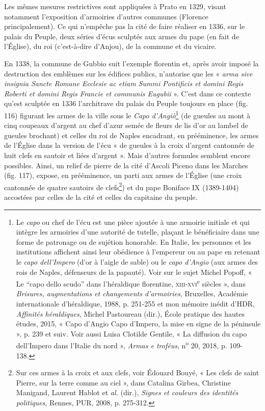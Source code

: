 \documentclass[12pt,twoside,openany]{book}
\begin{document}
Les mêmes mesures restrictives sont appliquées à Prato en 1329, visant notamment l’exposition d’armoiries d’autres communes (Florence principalement). Ce qui n’empêche pas la cité de faire réaliser en 1336, sur le palais du Peuple, deux séries d’écus sculptés aux armes du pape (en fait de l’Église), du roi (c’est-à-dire d’Anjou), de la commune et du vicaire.

En 1338, la commune de Gubbio suit l’exemple florentin et, après avoir imposé la destruction des emblèmes sur les édifices publics, n’autorise que les « \textit{arma sive insignia Sancte Romane Ecclesie ac etiam Summi Pontificis et domini Regis Roberti et domini Regis Francie et communis Eugubii }». C’est dans ce contexte qu’est sculptée en 1336 l’architrave du palais du Peuple toujours en place (fig. 116) figurant les armes de la ville sous le \textit{Capo d’Angiò}\footnote{Le \textit{capo} ou chef de l’écu est une pièce ajoutée à une armoirie initiale et qui intègre les armoiries d’une autorité de tutelle, plaçant le bénéficiaire dans une forme de patronage ou de sujétion honorable. En Italie, les personnes et les institutions affichent ainsi leur obédience à l’empereur ou au pape en retenant le \textit{capo dell’Impero} (d’or à l’aigle de sable) ou le \textit{capo d’Angio} (aux armes des rois de Naples, défenseurs de la papauté). Voir sur le sujet Michel Popoff, « Le “capo dello scudo” dans l’héraldique florentine, \textsc{xiii-xvi}\textsuperscript{e} siècles », dans \textit{Brisures, augmentations et changements d'armoiries}, Bruxelles, Académie internationale d’héraldique, 1988, p. 251-255 et mon mémoire inédit d’HDR, \textit{Affinités héraldiques}, Michel Pastoureau (dir.), École pratique des hautes études, 2015, « Capo d’Angio Capo d’Impero, la mise en signe de la péninsule », p. 239 et suiv. Voir aussi Luisa Clotilde Gentile, « La diffusion du capo dell'Impero dans l’Italie du nord », \textit{Armas e troféus}, n\textsuperscript{o} 20, 2018, p. 109-138.} (de gueules au mont à cinq coupeaux d’argent au chef d’azur semée de fleurs de lis d’or au lambel de gueules brochant) et celles du roi de Naples encadrant, en prééminence, les armes de l’Église dans la version de l’écu « de gueules à la croix d’argent cantonnée de huit clefs en sautoir et liées d’argent ». Mais d’autres formules semblent encore possibles. Ainsi, un relief de pierre de la cité d’Ascoli Piceno dans les Marches (fig. 117), expose, en prééminence, un parti aux armes de l’Église (une croix cantonnée de quatre sautoirs de clefs\footnote{Sur ces armes à la croix et aux clefs, voir Édouard Bouyé, « Les clefs de saint Pierre, sur la terre comme au ciel », dans Catalina Girbea, Christine Manigand, Laurent Hablot et \textit{al.} (dir.), \textit{Signes et couleurs des identités politiques}, Rennes, PUR, 2008, p. 275-312.}) et du pape Boniface IX (1389-1404) accostées par celles de la cité et celles du capitaine du peuple.
\end{document}
